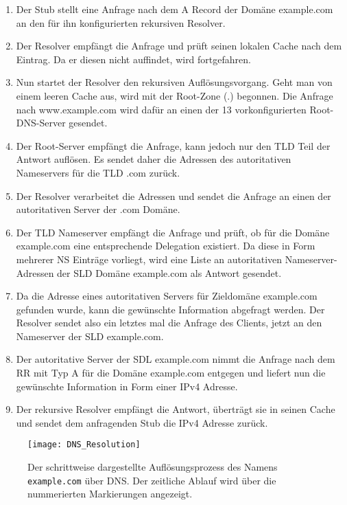 \begin{enumerate}
    \item Der Stub stellt eine Anfrage nach dem A Record der Domäne example.com an den für ihn konfigurierten rekursiven Resolver.
    \item Der Resolver empfängt die Anfrage und prüft seinen lokalen Cache nach dem Eintrag. Da er diesen nicht auffindet, wird fortgefahren.
    \item Nun startet der Resolver den rekursiven Auflösungsvorgang. Geht man von einem leeren Cache aus, wird mit der Root-Zone (.) begonnen. Die Anfrage nach www.example.com wird dafür an einen der 13 vorkonfigurierten Root-DNS-Server gesendet.
    \item Der Root-Server empfängt die Anfrage, kann jedoch nur den TLD Teil der Antwort auflösen. Es sendet daher die Adressen des autoritativen Nameservers für die TLD .com zurück.
    \item Der Resolver verarbeitet die Adressen und sendet die Anfrage an einen der autoritativen Server der .com Domäne.
    \item Der TLD Nameserver empfängt die Anfrage und prüft, ob für die Domäne example.com eine entsprechende Delegation existiert. Da diese in Form mehrerer NS Einträge vorliegt, wird eine Liste an autoritativen Nameserver-Adressen der SLD Domäne example.com als Antwort gesendet.
    \item Da die Adresse eines autoritativen Servers für Zieldomäne example.com gefunden wurde, kann die gewünschte Information abgefragt werden. Der Resolver sendet also ein letztes mal die Anfrage des Clients, jetzt an den Nameserver der SLD example.com.
    \item Der autoritative Server der SDL example.com nimmt die Anfrage nach dem RR mit Typ A für die Domäne example.com entgegen und liefert nun die gewünschte Information in Form einer IPv4 Adresse.
    \item Der rekursive Resolver empfängt die Antwort, überträgt sie in seinen Cache und sendet dem anfragenden Stub die IPv4 Adresse zurück.
\end{enumerate}

\begin{figure}[htbp]
    \centering
    \texttt{[image: DNS\_Resolution]}
    \caption[Dargestellte des DNS Auflösungsprozess für \texttt{example.com}]{Der schrittweise dargestellte Auflösungsprozess des Namens \texttt{example.com} über DNS. Der zeitliche Ablauf wird über die nummerierten Markierungen angezeigt.}
    \label{img:dnsresolution}
\end{figure}

